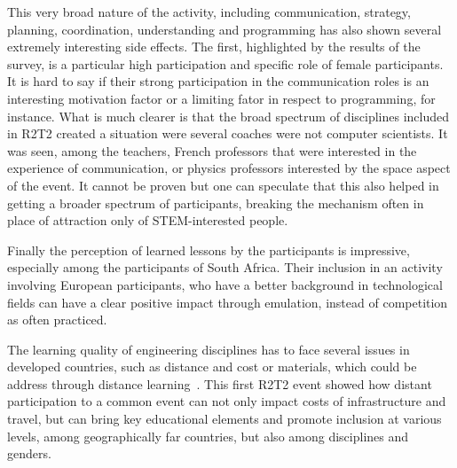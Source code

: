 \documentclass{intech-journal}
\begin{document}

This very broad nature of the activity, including communication, strategy, planning, coordination, understanding and programming has also shown several extremely interesting side effects.
The first, highlighted by the results of the survey, is a particular high participation and specific role of female participants.
It is hard to say if their strong participation in the communication roles is an interesting motivation factor or a limiting fator in respect to programming, for instance. 
What is much clearer is that the broad spectrum of disciplines included in R2T2 created a situation were several coaches were not computer scientists. 
It was seen, among the teachers, French professors that were interested in the experience of communication, or physics professors interested by the space aspect of the event. 
It cannot be proven but one can speculate that this also helped in getting a broader spectrum of participants, breaking the mechanism often in place of attraction only of STEM-interested people.

Finally the perception of learned lessons by the participants is impressive, especially among the participants of South Africa.
Their inclusion in an activity involving European participants, who have a better background in technological fields can have a clear positive impact through emulation, instead of competition as often practiced. 

The learning quality of engineering disciplines has to face several issues in developed countries, such as distance and cost or materials, which could be address through distance learning~\cite{winthrop2012new}. 
This first R2T2 event showed how distant participation to a common event can not only impact costs of infrastructure and travel, but can bring key educational elements and promote inclusion at various levels, among geographically far countries, but also among disciplines and genders.
\small
{}
\end{document}
